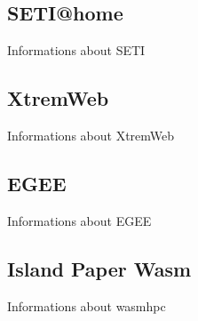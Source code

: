 \subsection{SETI@home}
\label{subsec:background:related_work:seti}
Informations about SETI
\subsection{XtremWeb}
\label{subsec:background:related_work:xtremweb}
Informations about XtremWeb
\subsection{EGEE}
\label{subsec:background:related_work:egee}
Informations about EGEE
\subsection{Island Paper Wasm}
\label{subsec:background:related_work:wasmhpc}
Informations about wasmhpc